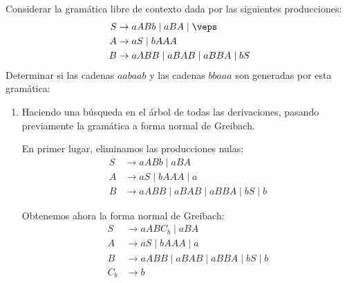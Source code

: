 \begin{ejercicio}\label{ej:1.6.5}
    Considerar la gramática libre de contexto dada por las siguientes producciones:
    \begin{align*}
        S &\rightarrow aABb \mid aBA \mid \veps \\
        A &\rightarrow aS \mid bAAA \\
        B &\rightarrow aABB \mid aBAB \mid aBBA \mid bS
    \end{align*}
    Determinar si las cadenas $aabaab$ y las cadenas $bbaaa$ son generadas por esta gramática:
    \begin{enumerate}
        \item Haciendo una búsqueda en el árbol de todas las derivaciones, pasando previamente la gramática a forma normal de Greibach.
        
        En primer lugar, eliminamos las producciones nulas:
        \begin{align*}
            S &\rightarrow aABb \mid aBA \\
            A &\rightarrow aS \mid bAAA \mid a\\
            B &\rightarrow aABB \mid aBAB \mid aBBA \mid bS \mid b
        \end{align*}

        Obtenemos ahora la forma normal de Greibach:
        \begin{align*}
            S &\rightarrow aABC_b \mid aBA \\
            A &\rightarrow aS \mid bAAA \mid a\\
            B &\rightarrow aABB \mid aBAB \mid aBBA \mid bS \mid b\\
            C_b &\rightarrow b
        \end{align*}


\end{enumerate}
\end{ejercicio}
